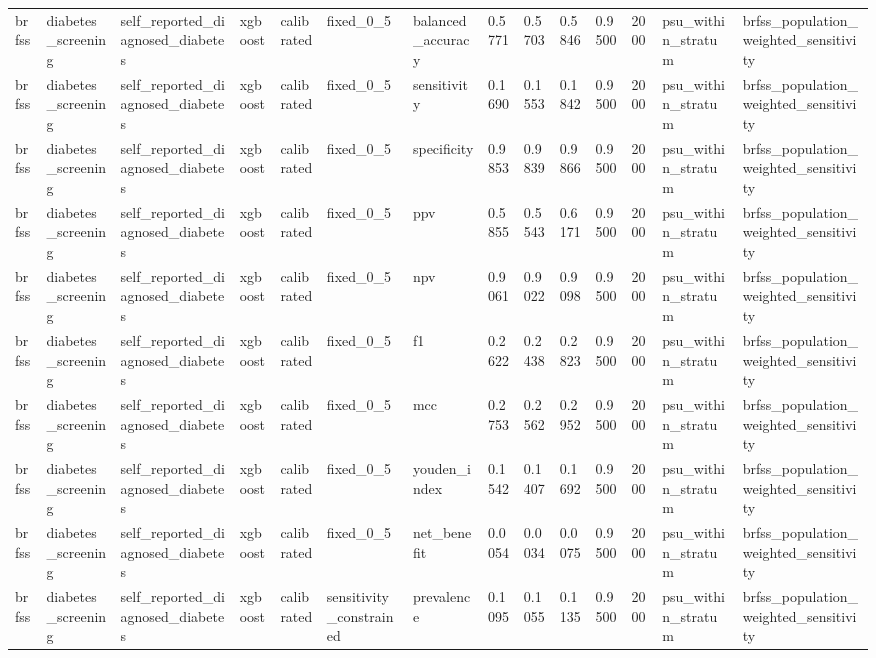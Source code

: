 \begin{tabular}{llllllllllllll}
brfss & diabetes\_screening & self\_reported\_diagnosed\_diabetes & xgboost & calibrated & fixed\_0\_5 & balanced\_accuracy & 0.5771 & 0.5703 & 0.5846 & 0.9500 & 2000 & psu\_within\_stratum & brfss\_population\_weighted\_sensitivity \\
brfss & diabetes\_screening & self\_reported\_diagnosed\_diabetes & xgboost & calibrated & fixed\_0\_5 & sensitivity & 0.1690 & 0.1553 & 0.1842 & 0.9500 & 2000 & psu\_within\_stratum & brfss\_population\_weighted\_sensitivity \\
brfss & diabetes\_screening & self\_reported\_diagnosed\_diabetes & xgboost & calibrated & fixed\_0\_5 & specificity & 0.9853 & 0.9839 & 0.9866 & 0.9500 & 2000 & psu\_within\_stratum & brfss\_population\_weighted\_sensitivity \\
brfss & diabetes\_screening & self\_reported\_diagnosed\_diabetes & xgboost & calibrated & fixed\_0\_5 & ppv & 0.5855 & 0.5543 & 0.6171 & 0.9500 & 2000 & psu\_within\_stratum & brfss\_population\_weighted\_sensitivity \\
brfss & diabetes\_screening & self\_reported\_diagnosed\_diabetes & xgboost & calibrated & fixed\_0\_5 & npv & 0.9061 & 0.9022 & 0.9098 & 0.9500 & 2000 & psu\_within\_stratum & brfss\_population\_weighted\_sensitivity \\
brfss & diabetes\_screening & self\_reported\_diagnosed\_diabetes & xgboost & calibrated & fixed\_0\_5 & f1 & 0.2622 & 0.2438 & 0.2823 & 0.9500 & 2000 & psu\_within\_stratum & brfss\_population\_weighted\_sensitivity \\
brfss & diabetes\_screening & self\_reported\_diagnosed\_diabetes & xgboost & calibrated & fixed\_0\_5 & mcc & 0.2753 & 0.2562 & 0.2952 & 0.9500 & 2000 & psu\_within\_stratum & brfss\_population\_weighted\_sensitivity \\
brfss & diabetes\_screening & self\_reported\_diagnosed\_diabetes & xgboost & calibrated & fixed\_0\_5 & youden\_index & 0.1542 & 0.1407 & 0.1692 & 0.9500 & 2000 & psu\_within\_stratum & brfss\_population\_weighted\_sensitivity \\
brfss & diabetes\_screening & self\_reported\_diagnosed\_diabetes & xgboost & calibrated & fixed\_0\_5 & net\_benefit & 0.0054 & 0.0034 & 0.0075 & 0.9500 & 2000 & psu\_within\_stratum & brfss\_population\_weighted\_sensitivity \\
brfss & diabetes\_screening & self\_reported\_diagnosed\_diabetes & xgboost & calibrated & sensitivity\_constrained & prevalence & 0.1095 & 0.1055 & 0.1135 & 0.9500 & 2000 & psu\_within\_stratum & brfss\_population\_weighted\_sensitivity \\

\end{tabular}
